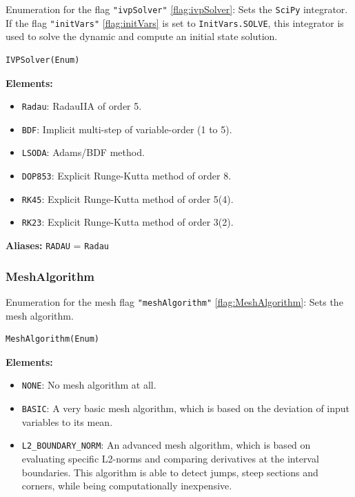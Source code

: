 \documentclass[12pt]{article}
\begin{document}
\begin{mdframed}[backgroundcolor=gray!10, roundcorner=10pt,
		linewidth=1pt]
	Enumeration for the flag \texttt{"ivpSolver"}
	\ref{flag:ivpSolver}:
	Sets the \texttt{SciPy} integrator. If the flag
	\texttt{"initVars"} \ref{flag:initVars} is set to
	\texttt{InitVars.SOLVE}, this
	integrator is used to solve the dynamic and compute an initial state
	solution.

	\begin{lstlisting}
IVPSolver(Enum)
		\end{lstlisting}
	\label{enum:IVPSolver}
	\textbf{Elements:}
	\begin{itemize}
		\item \texttt{Radau}: RadauIIA of order 5.
		\item \texttt{BDF}: Implicit multi-step of
		      variable-order (1 to 5).
		\item \texttt{LSODA}: Adams/BDF method.
		\item \texttt{DOP853}: Explicit Runge-Kutta method of
		      order 8.
		\item \texttt{RK45}: Explicit Runge-Kutta method of
		      order 5(4).
		\item \texttt{RK23}: Explicit Runge-Kutta method of
		      order 3(2).
	\end{itemize}

	\textbf{Aliases:} \texttt{RADAU} = \texttt{Radau}
\end{mdframed}

\subsubsection{MeshAlgorithm}

\begin{mdframed}[backgroundcolor=gray!10, roundcorner=10pt,
		linewidth=1pt]
	Enumeration for the mesh flag \texttt{"meshAlgorithm"}
	\ref{flag:MeshAlgorithm}:
	Sets the mesh algorithm.

	\begin{lstlisting}
MeshAlgorithm(Enum)
		\end{lstlisting}
	\label{enum:MeshAlgorithm}
	\textbf{Elements:}
	\begin{itemize}
		\item \texttt{NONE}: No mesh algorithm at all.
		\item \texttt{BASIC}: A very basic mesh algorithm, which is
		      based on the deviation of input variables to its mean.
		\item \texttt{L2\_BOUNDARY\_NORM}: An advanced mesh algorithm,
		      which is based on evaluating specific L2-norms and
		      comparing derivatives at the
		      interval boundaries. This algorithm is able to detect
		      jumps, steep sections and
		      corners, while being
		      computationally inexpensive.
	\end{itemize}

\end{mdframed}
\end{document}
